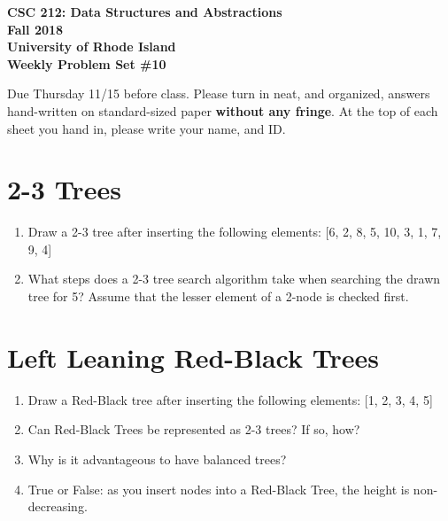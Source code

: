 \documentclass[11pt]{article}
\begin{document}
    \thispagestyle{empty}
    
    \begin{center}
        {\Large\bf CSC 212: Data Structures and Abstractions}\\
        \medskip
        {\Large\bf Fall 2018}\\
        \medskip
        {\Large\bf University of Rhode Island}\\
        \bigskip
        {\Large\bf Weekly Problem Set \#10}
    \end{center}
    
    Due Thursday 11/15 before class. Please turn in neat, and organized, answers hand-written on standard-sized paper \textbf{without any fringe}. At the top of each sheet you hand in, please write your name, and ID.
    \section{2-3 Trees}
\begin{enumerate}
    \item Draw a 2-3 tree after inserting the following elements: [6, 2, 8, 5, 10, 3, 1, 7, 9, 4]

    \item What steps does a 2-3 tree search algorithm take when searching the drawn tree for 5? Assume that the lesser element of a 2-node is checked first.
    
\end{enumerate}

\section{Left Leaning Red-Black Trees}
\begin{enumerate}
    \item Draw a Red-Black tree after inserting the following elements: [1, 2, 3, 4, 5]

    \item Can Red-Black Trees be represented as 2-3 trees? If so, how?

    \item Why is it advantageous to have balanced trees?

    \item True or False: as you insert nodes into a Red-Black Tree, the height is non-decreasing.
\end{enumerate}
    
    \label{r:lastpage}
    
    
\end{document}
